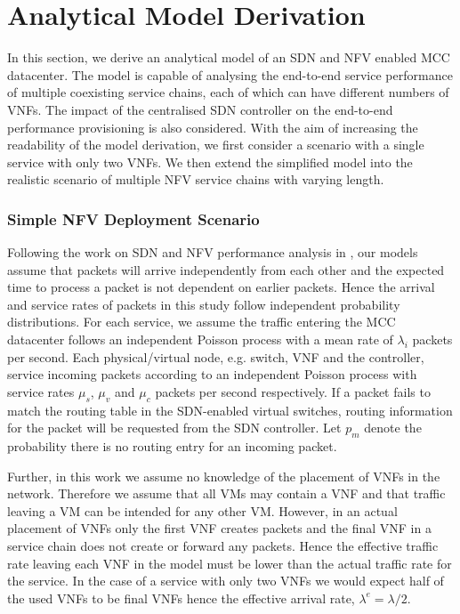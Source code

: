 
\section{Analytical Model Derivation}
\label{sec:analytical_model}

In this section, we derive an analytical model of an SDN and NFV enabled MCC datacenter. The model is capable of analysing the end-to-end service performance of multiple coexisting service chains, each of which can have different numbers of VNFs. The impact of the centralised SDN controller on the end-to-end performance provisioning is also considered. With the aim of increasing the readability of the model derivation, we first consider a scenario with a single service with only two VNFs. We then extend the simplified model into the realistic scenario of multiple NFV service chains with varying length.

\subsubsection{Simple NFV Deployment Scenario}
Following the work on SDN and NFV performance analysis in \cite{LongoDBS15, GebertZLST16, MiaoMWHZWL19}, our models assume that packets will arrive independently from each other and the expected time to process a packet is not dependent on earlier packets. Hence the arrival and service rates of packets in this study follow independent probability distributions. For each service, we assume the traffic entering the MCC datacenter follows an independent Poisson process with a mean rate of $\lambda_i$ packets per second. Each physical/virtual node, e.g. switch, VNF and the controller, service incoming packets according to an independent Poisson process with service rates $\mu_{s}$, $\mu_{v}$ and $\mu_{c}$ packets per second respectively. If a packet fails to match the routing table in the SDN-enabled virtual switches, routing information for the packet will be requested from the SDN controller. Let $p_m$ denote the probability there is no routing entry for an incoming packet.

Further, in this work we assume no knowledge of the placement of VNFs in the network. Therefore we assume that all VMs may contain a VNF and that traffic leaving a VM can be intended for any other VM. However, in an actual placement of VNFs only the first VNF creates packets and the final VNF in a service chain does not create or forward any packets. Hence the effective traffic rate leaving each VNF in the model must be lower than the actual traffic rate for the service. In the case of a service with only two VNFs we would expect half of the used VNFs to be final VNFs hence the effective arrival rate, $\lambda^e = \lambda / 2$.

